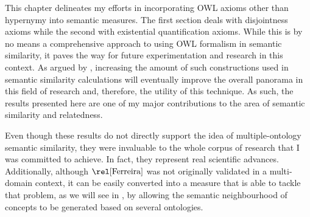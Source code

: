 This chapter delineates my efforts in incorporating OWL axioms other than hypernymy into semantic measures. The first section deals with disjointness axioms while the second with existential quantification axioms. While this is by no means a comprehensive approach to using OWL formalism in semantic similarity, it paves the way for future experimentation and research in this context. As argued by \citet{Couto2013}, increasing the amount of such constructions used in semantic similarity calculations will eventually improve the overall panorama in this field of research and, therefore, the utility of this technique. As such, the results presented here are one of my major contributions to the area of semantic similarity and relatedness.

Even though these results do not directly support the idea of multiple-ontology semantic similarity, they were invaluable to the whole corpus of research that I was committed to achieve. In fact, they represent real scientific advances. Additionally, although $\ferreira$ was not originally validated in a multi-domain context, it can be easily converted into a measure that is able to tackle that problem, as we will see in , by allowing the semantic neighbourhood of concepts to be generated based on several ontologies.
